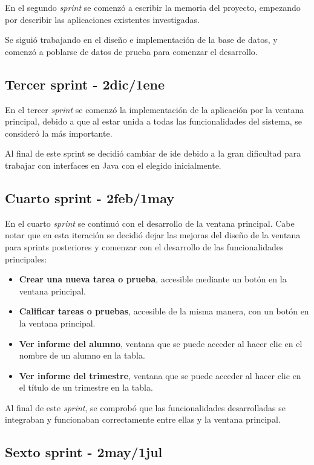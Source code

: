 En el segundo \textit{sprint} se comenzó a escribir la memoria del proyecto, empezando por describir las aplicaciones existentes investigadas.

Se siguió trabajando en el diseño e implementación de la base de datos, y comenzó a poblarse de datos de prueba para comenzar el desarrollo.


\subsection{Tercer sprint - 2dic/1ene}

En el tercer \textit{sprint} se comenzó la implementación de la aplicación por la ventana principal, debido a que al estar unida a todas las funcionalidades del sistema, se consideró la más importante.

Al final de este sprint se decidió cambiar de \gls{ide} debido a la gran dificultad para trabajar con interfaces en Java con el elegido inicialmente.

\subsection{Cuarto sprint - 2feb/1may}

En el cuarto \textit{sprint} se continuó con el desarrollo de la ventana principal. Cabe notar que en esta iteración se decidió dejar las mejoras del diseño de la ventana para sprints posteriores y comenzar con el desarrollo de las funcionalidades principales:
\begin{itemize}
	\item \textbf{Crear una nueva tarea o prueba}, accesible mediante un botón en la ventana principal.
	\item \textbf{Calificar tareas o pruebas}, accesible de la misma manera, con un botón en la ventana principal.
	\item \textbf{Ver informe del alumno}, ventana que se puede acceder al hacer clic en el nombre de un alumno en la tabla.
	\item \textbf{Ver informe del trimestre}, ventana que se puede acceder al hacer clic en el título de un trimestre en la tabla.
\end{itemize}


Al final de este \textit{sprint}, se comprobó que las funcionalidades desarrolladas se integraban y funcionaban correctamente entre ellas y la ventana principal.

\subsection{Sexto sprint - 2may/1jul}

